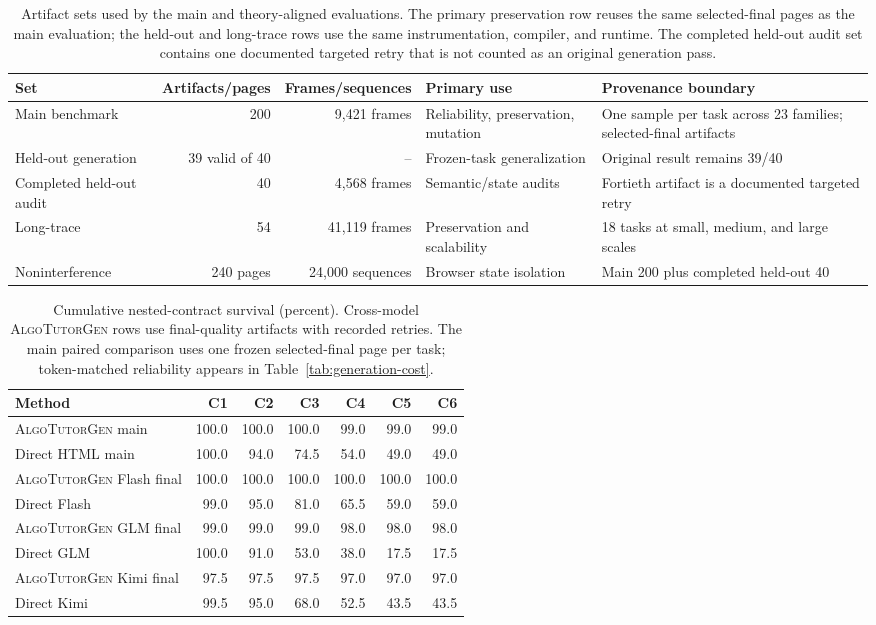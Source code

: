 \documentclass[letterpaper]{article}
\newcommand{\system}{\textsc{AlgoTutorGen}}
\begin{document}
\begin{table}[t]
\centering
\small
\begin{tabular}{@{}lrrp{}p{}@{}}
\toprule
Set & Artifacts/pages & Frames/sequences & Primary use & Provenance boundary \\
\midrule
Main benchmark & 200 & 9,421 frames & Reliability, preservation, mutation & One sample per task across 23 families; selected-final artifacts \\
Held-out generation & 39 valid of 40 & -- & Frozen-task generalization & Original result remains 39/40 \\
Completed held-out audit & 40 & 4,568 frames & Semantic/state audits & Fortieth artifact is a documented targeted retry \\
Long-trace & 54 & 41,119 frames & Preservation and scalability & 18 tasks at small, medium, and large scales \\
Noninterference & 240 pages & 24,000 sequences & Browser state isolation & Main 200 plus completed held-out 40 \\
\bottomrule
\end{tabular}
\caption{Artifact sets used by the main and theory-aligned evaluations. The primary preservation row reuses the same selected-final pages as the main evaluation; the held-out and long-trace rows use the same instrumentation, compiler, and runtime. The completed held-out audit set contains one documented targeted retry that is not counted as an original generation pass.}
\label{tab:artifact-sets}
\end{table}

\begin{table}[t]
\centering
\small
\begin{tabular}{@{}lrrrrrr@{}}
\toprule
Method & C1 & C2 & C3 & C4 & C5 & C6 \\
\midrule
\system{} main & 100.0 & 100.0 & 100.0 & 99.0 & 99.0 & 99.0 \\
Direct HTML main & 100.0 & 94.0 & 74.5 & 54.0 & 49.0 & 49.0 \\
\addlinespace
\system{} Flash final & 100.0 & 100.0 & 100.0 & 100.0 & 100.0 & 100.0 \\
Direct Flash & 99.0 & 95.0 & 81.0 & 65.5 & 59.0 & 59.0 \\
\system{} GLM final & 99.0 & 99.0 & 99.0 & 98.0 & 98.0 & 98.0 \\
Direct GLM & 100.0 & 91.0 & 53.0 & 38.0 & 17.5 & 17.5 \\
\system{} Kimi final & 97.5 & 97.5 & 97.5 & 97.0 & 97.0 & 97.0 \\
Direct Kimi & 99.5 & 95.0 & 68.0 & 52.5 & 43.5 & 43.5 \\
\bottomrule
\end{tabular}
\caption{Cumulative nested-contract survival (percent). Cross-model \system{} rows use final-quality artifacts with recorded retries. The main paired comparison uses one frozen selected-final page per task; token-matched reliability appears in Table~\ref{tab:generation-cost}.}
\label{tab:nested-survival}
\end{table}
\FloatBarrier
\end{document}
